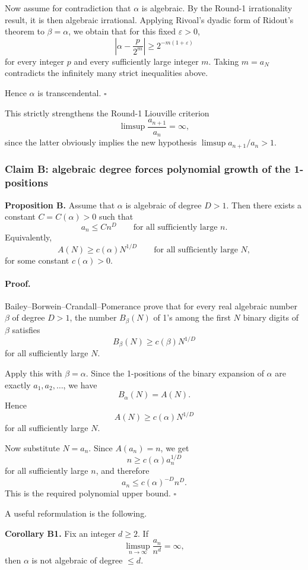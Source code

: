 Now assume for contradiction that $\alpha$ is algebraic. By the Round-1 irrationality result, it is then algebraic irrational. Applying Rivoal's dyadic form of Ridout's theorem to $\beta=\alpha$, we obtain that for this fixed $\varepsilon>0$,
\[
\left|\alpha-\frac{p}{2^m}\right|\ge 2^{-m(1+\varepsilon)}
\]
for every integer $p$ and every sufficiently large integer $m$. Taking $m=a_N$ contradicts the infinitely many strict inequalities above.

Hence $\alpha$ is transcendental.
\hfill$\square$

\medskip
This strictly strengthens the Round-1 Liouville criterion
\[
\limsup \frac{a_{n+1}}{a_n}=\infty,
\]
since the latter obviously implies the new hypothesis $\limsup a_{n+1}/a_n>1$.

\subsubsection*{Claim B: algebraic degree forces polynomial growth of the 1-positions}
\textbf{Proposition B.}
Assume that $\alpha$ is algebraic of degree $D>1$. Then there exists a constant $C=C(\alpha)>0$ such that
\[
a_n\le Cn^D
\qquad\text{for all sufficiently large }n.
\]
Equivalently,
\[
A(N)\ge c(\alpha)N^{1/D}
\qquad\text{for all sufficiently large }N,
\]
for some constant $c(\alpha)>0$.

\paragraph{Proof.}
Bailey--Borwein--Crandall--Pomerance prove that for every real algebraic number $\beta$ of degree $D>1$, the number $B_\beta(N)$ of 1's among the first $N$ binary digits of $\beta$ satisfies
\[
B_\beta(N)\ge c(\beta)N^{1/D}
\]
for all sufficiently large $N$.

Apply this with $\beta=\alpha$. Since the 1-positions of the binary expansion of $\alpha$ are exactly $a_1,a_2,\dots$, we have
\[
B_\alpha(N)=A(N).
\]
Hence
\[
A(N)\ge c(\alpha)N^{1/D}
\]
for all sufficiently large $N$.

Now substitute $N=a_n$. Since $A(a_n)=n$, we get
\[
n\ge c(\alpha)a_n^{1/D}
\]
for all sufficiently large $n$, and therefore
\[
a_n\le c(\alpha)^{-D}n^D.
\]
This is the required polynomial upper bound.
\hfill$\square$

\medskip
A useful reformulation is the following.

\textbf{Corollary B1.}
Fix an integer $d\ge 2$. If
\[
\limsup_{n\to\infty}\frac{a_n}{n^d}=\infty,
\]
then $\alpha$ is not algebraic of degree $\le d$.

